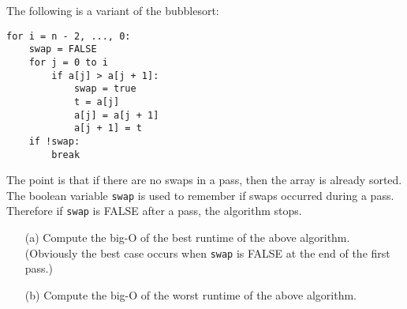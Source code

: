 The following is a variant of the bubblesort:
\begin{Verbatim}[frame=single, fontsize=\small]
for i = n - 2, ..., 0:
    swap = FALSE
    for j = 0 to i
        if a[j] > a[j + 1]:
            swap = true
            t = a[j]
            a[j] = a[j + 1]
            a[j + 1] = t
    if !swap:
        break
\end{Verbatim}
The point is that if there are no swaps in a pass, then
the array is already sorted.
The boolean variable \verb!swap! is used to remember if swaps
occurred during a pass.
Therefore if \verb!swap! is FALSE after a pass, the algorithm stops.
\begin{itemize}
\item[(a)] Compute the big-O of the best runtime of the above algorithm.
(Obviously the best case occurs when \verb!swap! is FALSE at the end of
the first pass.)
\item[(b)] Compute the big-O of the worst runtime of the above algorithm.
\end{itemize}
